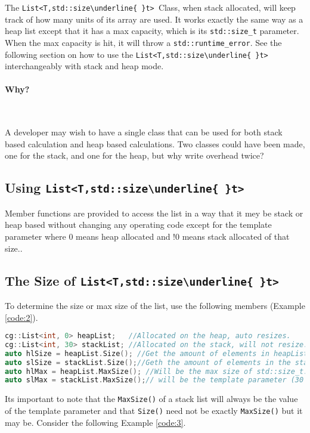 \documentclass{article}
\newcommand{\theobj}{\protect\Verb+List<T,std::size\underline{ }t> +}
\begin{document}
The \theobj Class, when stack allocated, will keep track of how many units of its array are used.  It works exactly the same way as a heap list except that it has a max capacity, which is its \Verb+std::size_t+ parameter.  When the max capacity is hit, it will throw a \Verb+std::runtime_error+.  See the following section on how to use the \theobj interchangeably with stack and heap mode.
\paragraph{Why?} \hfill \\
\par
A developer may wish to have a single class that can be used for both stack based calculation and heap based calculations.  Two classes could have been made, one for the stack, and one for the heap, but why write overhead twice?

\subsection{Using \theobj}

Member functions are provided to access the list in a way that it mey be stack or heap based without changing any operating code except for the template parameter where 0 means heap allocated and !0 means stack allocated of that size..

\subsection{The Size of \theobj}

To determine the size or max size of the list, use the following members (Example \vref{code:2}).


\begin{lstlisting}[language=C++, label=code:2, caption=Determining the Size of a list.]
cg::List<int, 0> heapList;   //Allocated on the heap, auto resizes.
cg::List<int, 30> stackList; //Allocated on the stack, will not resize.
auto hlSize = heapList.Size(); //Get the amount of elements in heapList.
auto slSize = stackList.Size();//Geth the amount of elements in the stackList.  May be  the size of the template paramter or less.
auto hlMax = heapList.MaxSize(); //Will be the max size of std::size_t.
auto slMax = stackList.MaxSize();// will be the template parameter (30 in this example).
\end{lstlisting}

Its important to note that the \Verb+MaxSize()+ of a stack list will always be the value of the template parameter and that \Verb+Size()+ need not be exactly \Verb+MaxSize()+ but it may be. Consider the following Example \vref{code:3}.
\end{document}
